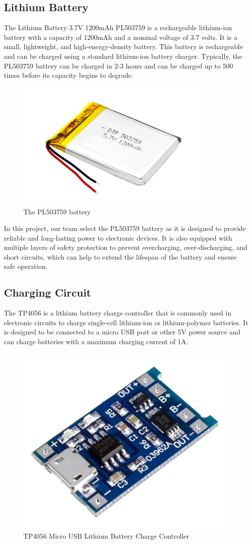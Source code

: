 \documentclass[a4paper, twoside]{report}
\begin{document}
\subsection{Lithium Battery}
The Lithium Battery 3.7V 1200mAh PL503759 is a rechargeable lithium-ion battery with a capacity of 1200mAh and a nominal voltage of 3.7 volts. It is a small, lightweight, and high-energy-density battery. This battery is rechargeable and can be charged using a standard lithium-ion battery charger. Typically, the PL503759 battery can be charged in 2-3 hours and can be charged up to 500 times before its capacity begins to degrade.
\begin{figure}[H]
    \begin{center}
    \includegraphics[width=.45\textwidth]{images/Baterry.png}
    \caption{The PL503759 battery}
    \end{center}
\end{figure} 
In this project, our team select the PL503759 battery as it is designed to provide reliable and long-lasting power to electronic devices. It is also equipped with multiple layers of safety protection to prevent overcharging, over-discharging, and short circuits, which can help to extend the lifespan of the battery and ensure safe operation.

\subsection{Charging Circuit}
The TP4056 is a lithium battery charge controller that is commonly used in electronic circuits to charge single-cell lithium-ion or lithium-polymer batteries. It is designed to be connected to a micro USB port or other 5V power source and can charge batteries with a maximum charging current of 1A.
\begin{figure}[H]
    \begin{center}
    \includegraphics[width=.35\textwidth]{images/TP4056.png}
    \caption{TP4056 Micro USB Lithium Battery Charge Controller}
    \end{center}
\end{figure} 
\end{document}
